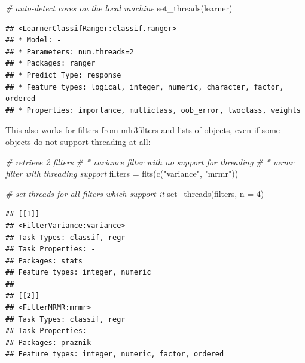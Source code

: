 \documentclass[
]{scrbook}
\newenvironment{Shaded}{\begin{snugshade}}{\end{snugshade}}
\newcommand{\AttributeTok}[1]{\textcolor[rgb]{0.77,0.63,0.00}{#1}}
\newcommand{\CommentTok}[1]{\textcolor[rgb]{0.56,0.35,0.01}{\textit{#1}}}
\newcommand{\DecValTok}[1]{\textcolor[rgb]{0.00,0.00,0.81}{#1}}
\newcommand{\FunctionTok}[1]{\textcolor[rgb]{0.00,0.00,0.00}{#1}}
\newcommand{\NormalTok}[1]{#1}
\newcommand{\OtherTok}[1]{\textcolor[rgb]{0.56,0.35,0.01}{#1}}
\newcommand{\SpecialCharTok}[1]{\textcolor[rgb]{0.00,0.00,0.00}{#1}}
\newcommand{\StringTok}[1]{\textcolor[rgb]{0.31,0.60,0.02}{#1}}
\renewenvironment{Shaded} {\begin{snugshade}\small} {\end{snugshade}}
\begin{document}
\begin{Shaded}
\begin{Highlighting}[]
\CommentTok{\# auto{-}detect cores on the local machine}
\FunctionTok{set\_threads}\NormalTok{(learner)}
\end{Highlighting}
\end{Shaded}

\begin{verbatim}
## <LearnerClassifRanger:classif.ranger>
## * Model: -
## * Parameters: num.threads=2
## * Packages: ranger
## * Predict Type: response
## * Feature types: logical, integer, numeric, character, factor, ordered
## * Properties: importance, multiclass, oob_error, twoclass, weights
\end{verbatim}

This also works for filters from \href{https://mlr3filters.mlr-org.com}{mlr3filters} and lists of objects, even if some objects do not support threading at all:

\begin{Shaded}
\begin{Highlighting}[]
\CommentTok{\# retrieve 2 filters}
\CommentTok{\# * variance filter with no support for threading}
\CommentTok{\# * mrmr filter with threading support}
\NormalTok{filters }\OtherTok{=} \FunctionTok{flts}\NormalTok{(}\FunctionTok{c}\NormalTok{(}\StringTok{"variance"}\NormalTok{, }\StringTok{"mrmr"}\NormalTok{))}

\CommentTok{\# set threads for all filters which support it}
\FunctionTok{set\_threads}\NormalTok{(filters, }\AttributeTok{n =} \DecValTok{4}\NormalTok{)}
\end{Highlighting}
\end{Shaded}

\begin{verbatim}
## [[1]]
## <FilterVariance:variance>
## Task Types: classif, regr
## Task Properties: -
## Packages: stats
## Feature types: integer, numeric
## 
## [[2]]
## <FilterMRMR:mrmr>
## Task Types: classif, regr
## Task Properties: -
## Packages: praznik
## Feature types: integer, numeric, factor, ordered
\end{verbatim}

\begin{Shaded}
\end{Shaded}
\end{document}
